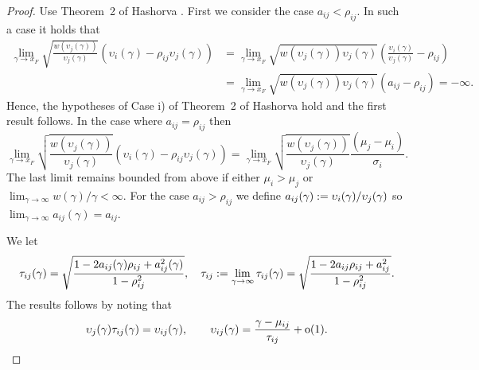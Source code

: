 \begin{subappendices}
\begin{proof}

Use Theorem~2 of Hashorva \cite{hashorva2007asymptotic}.
First we consider the case $a_{ij}<\rho_{ij}$.  In such a case it holds that
\begin{align*}
 \lim_{\gamma\to x_F} \sqrt{\frac{w(\upsilon_j(\gamma))}{\upsilon_j(\gamma)}}\left(\upsilon_i(\gamma)-\rho_{ij}\upsilon_j(\gamma)\right)
 &=\lim_{\gamma\to x_F} \sqrt{{w(\upsilon_j(\gamma))\upsilon_j(\gamma)}}\left(\frac{\upsilon_i(\gamma)}{\upsilon_j(\gamma)}-\rho_{ij}\right)\\
 &=\lim_{\gamma\to x_F} \sqrt{{w(\upsilon_j(\gamma))\upsilon_j(\gamma)}}\left(a_{ij}-\rho_{ij}\right)=-\infty.
\end{align*}
Hence, the hypotheses of Case i) of Theorem~2 of Hashorva \cite{hashorva2007asymptotic} hold and the first result follows.
In the case where $a_{ij}=\rho_{ij}$ then
\[
 \lim_{\gamma\to x_F} \sqrt{\frac{w(\upsilon_j(\gamma))}{\upsilon_j(\gamma)}}\left(\upsilon_i(\gamma)-\rho_{ij}\upsilon_j(\gamma)\right)
 =\lim_{\gamma\to x_F} \sqrt{\frac{w(\upsilon_j(\gamma))}{\upsilon_j(\gamma)}}\frac{(\mu_j-\mu_{i})}{\sigma_i}.
\]
The last limit remains bounded from above if either $\mu_i>\mu_j$ or $\lim_{\gamma\to\infty}w(\gamma)/\gamma<\infty$.
For the case $a_{ij}>\rho_{ij}$ we define
$a_{ij}(\gamma) := \upsilon_i(\gamma) / \upsilon_j(\gamma)$ so $\lim_{\gamma \to \infty} a_{ij}(\gamma)=a_{ij}$.

We let
 \[
   \tau_{ij}(\gamma) =
   \sqrt{ \frac{1-2a_{ij}(\gamma)\rho_{ij} + a_{ij}^2(\gamma)}{1-\rho^2_{ij}}},\quad
  \tau_{ij} := \lim_{\gamma\to\infty}\tau_{ij}(\gamma)
    =\sqrt{ \frac{1-2a_{ij}\rho_{ij} + a_{ij}^2}{1-\rho^2_{ij}}}.
\]
The results follows by noting that
\[
 \upsilon_j(\gamma)\tau_{ij}(\gamma)= \upsilon_{ij}(\gamma),\qquad
 \upsilon_{ij}(\gamma)= \frac{\gamma-\mu_{ij}}{\tau_{ij}}+{\mathrm{o}}(1).
\]

\end{proof}
\end{subappendices}